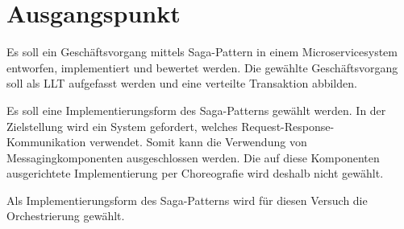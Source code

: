 \section{Ausgangspunkt}

Es soll ein Geschäftsvorgang mittels Saga-Pattern in einem Microservicesystem entworfen, implementiert und bewertet werden. Die gewählte Geschäftsvorgang soll als LLT aufgefasst werden und eine verteilte Transaktion abbilden. 

Es soll eine Implementierungsform des Saga-Patterns gewählt werden. In der Zielstellung wird ein System gefordert, welches Request-Response-Kommunikation verwendet. Somit kann die Verwendung von Messagingkomponenten ausgeschlossen werden. Die auf diese Komponenten ausgerichtete Implementierung per Choreografie wird deshalb nicht gewählt. 

Als Implementierungsform des Saga-Patterns wird für diesen Versuch die Orchestrierung gewählt. 